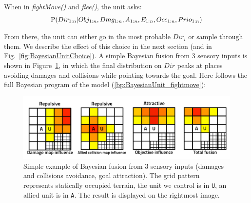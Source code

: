 When in \textit{fightMove()} and \textit{flee()}, the unit asks:
\begin{equation}
\mathrm{P}(Dir_{1:n} | Obj_{1:n}, Dmg_{1:n}, A_{1:n}, E_{1:n}, Occ_{1:n}, Prio_{1:n})
\end{equation}

From there, the unit can either go in the most probable $Dir_i$ or sample through them. We describe the effect of this choice in the next section (and in Fig.~\ref{fig:BayesianUnitChoice}). A simple Bayesian fusion from 3 sensory inputs is shown in Figure~\ref{fig:BayesianUnitExample}, in which the final distribution on $Dir$ peaks at places avoiding damages and collisions while pointing towards the goal. Here follows the full Bayesian program of the model (\ref{bp:BayesianUnit_fightmove}):

\begin{figure}[h]
\begin{center}
\includegraphics[width=13cm]{images/example_BayesianUnit.pdf}
\end{center}
\caption{Simple example of Bayesian fusion from 3 sensory inputs (damages and collisions avoidance, goal attraction). The grid pattern represents statically occupied terrain, the unit we control is in \texttt{U}, an allied unit is in \texttt{A}. The result is displayed on the rightmost image.}
\label{fig:BayesianUnitExample}
\end{figure}

